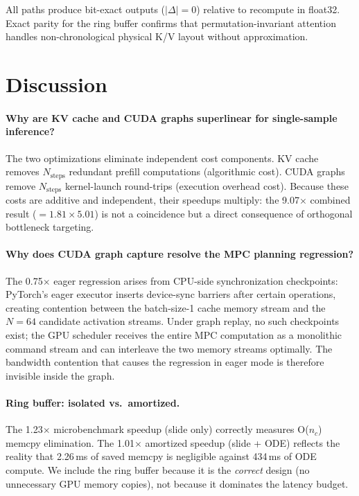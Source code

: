 \documentclass[letterpaper,twocolumn,10pt]{article}
\begin{document}
All paths produce bit-exact outputs ($|\Delta|{=}0$) relative to
recompute in float32.  Exact parity for the ring buffer confirms that
permutation-invariant attention handles non-chronological physical
K/V layout without approximation.

\section{Discussion}

\paragraph{Why are KV cache and CUDA graphs superlinear for
single-sample inference?}
The two optimizations eliminate independent cost components.
KV cache removes $N_\text{steps}$ redundant prefill computations
(algorithmic cost).  CUDA graphs remove $N_\text{steps}$ kernel-launch
round-trips (execution overhead cost).  Because these costs are
additive and independent, their speedups multiply: the 9.07$\times$
combined result ($= 1.81 \times 5.01$) is not a coincidence but a
direct consequence of orthogonal bottleneck targeting.

\paragraph{Why does CUDA graph capture resolve the MPC planning
regression?}
The 0.75$\times$ eager regression arises from CPU-side synchronization
checkpoints: PyTorch's eager executor inserts device-sync barriers
after certain operations, creating contention between the batch-size-1
cache memory stream and the $N{=}64$ candidate activation streams.
Under graph replay, no such checkpoints exist; the GPU scheduler
receives the entire MPC computation as a monolithic command stream and
can interleave the two memory streams optimally.  The bandwidth
contention that causes the regression in eager mode is therefore
invisible inside the graph.

\paragraph{Ring buffer: isolated vs.\ amortized.}
The 1.23$\times$ microbenchmark speedup (slide only) correctly
measures O($n_c$) memcpy elimination.  The 1.01$\times$ amortized
speedup (slide + ODE) reflects the reality that 2.26\,ms of saved
memcpy is negligible against 434\,ms of ODE compute.  We include the
ring buffer because it is the \emph{correct} design (no unnecessary
GPU memory copies), not because it dominates the latency budget.
\end{document}
